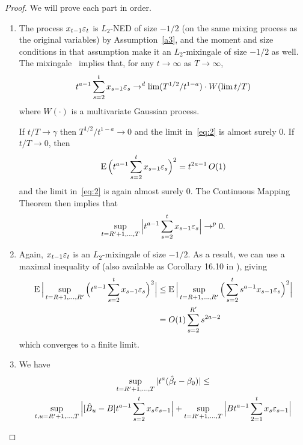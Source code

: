 \documentclass[12pt,fleqn]{article}
\begin{document}
\begin{proof}
  We will prove each part in order.
  \begin{enumerate}
  \item The process $x_{t-1} \varepsilon_t$ is $L_2$-NED of size $-1/2$ (on
    the same mixing process as the original variables) by
    Assumption~\ref{a3}, and the moment and size conditions in that
    assumption make it an $L_2$-mixingale of size $-1/2$ as well. The
    mixingale \fclt\ implies that, for any $t \to \infty$ as $T \to \infty$,
    \begin{equation}\label{eq:2}
      t^{a - 1} \sum_{s=2}^t x_{s-1} \varepsilon_s \to^d \lim (T^{1/2} / t^{1-a}) \cdot W(\lim t/T)
    \end{equation}
    where $W(\cdot)$ is a multivariate Gaussian process.

    If $t/T \to \gamma$ then $T^{1/2} / t^{1-a} \to 0$ and the limit
    in~\eqref{eq:2} is almost surely 0. If $t/T \to 0$, then
    \begin{equation*}
      \operatorname{E}\Big( t^{a - 1} \sum_{s=2}^t x_{s-1} \varepsilon_s \Big)^2 = t^{2a - 1}\, O(1)
    \end{equation*}
    and the limit in~\eqref{eq:2} is again almost surely 0. The
    Continuous Mapping Theorem then implies that
    \begin{equation*}
      \sup_{t=R'+1,\dots,T} \Big| t^{a - 1} \sum_{s=2}^t x_{s-1} \varepsilon_s \Big| \to^p 0.
    \end{equation*}
  \item Again, $x_{t-1} \varepsilon_t$ is an $L_2$-mixingale of size
    $-1/2$. As a result, we can use a maximal inequality of
    \cite{Mcl:75} (also available as Corollary 16.10 in
    \citealp{Dav:94}), giving
    \begin{align*}
      \operatorname{E} \Big\lvert \sup_{t=R+1,\dots,R'} \Big(t^{a - 1} \sum_{s=2}^t x_{s-1} \varepsilon_s\Big)^2 \Big\rvert
      &\leq \operatorname{E} \Big\lvert \sup_{t=R+1,\dots,R'} \Big(\sum_{s=2}^t s^{a-1} x_{s-1} \varepsilon_s\Big)^2 \Big\rvert \\
      &= O(1) \sum_{s=2}^{R'} s^{2a - 2}
    \end{align*}
    which converges to a finite limit.
  \item We have
    \begin{multline*}
      \sup_{t=R'+1,\dots,T} | t^a (\hat{\beta}_t - \btrue) | \leq \\
      \sup_{t,u =R'+1,\dots,T} \Big| [ \hat{B}_u - B]
      t^{a-1} \sum_{s=2}^t x_s \ep_{s-1} \Big| + \sup_{t = R'+1,\dots,T} \Big|
      B t^{a-1} \sum_{2=1}^t x_s \ep_{s-1} \Big|

\end{multline*}
\end{enumerate}
\end{proof}
\end{document}
